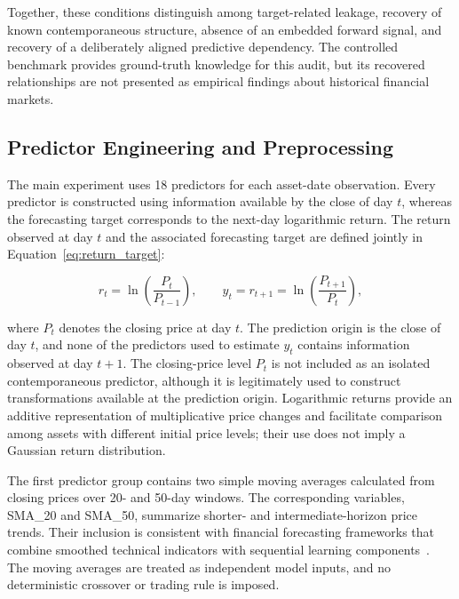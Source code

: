 \documentclass[utf8]{FrontiersinHarvard} %
\begin{document}
Together, these conditions distinguish among target-related leakage, recovery of known contemporaneous structure, absence of an embedded forward signal, and recovery of a deliberately aligned predictive dependency. The controlled benchmark provides ground-truth knowledge for this audit, but its recovered relationships are not presented as empirical findings about historical financial markets.

\subsection{Predictor Engineering and Preprocessing}
\label{subsec:predictor_engineering}

The main experiment uses 18 predictors for each asset-date observation. Every predictor is constructed using information available by the close of day \(t\), whereas the forecasting target corresponds to the next-day logarithmic return. The return observed at day \(t\) and the associated forecasting target are defined jointly in Equation~\ref{eq:return_target}:

\begin{equation}
	r_t
	=
	\ln\left(\frac{P_t}{P_{t-1}}\right),
	\qquad
	y_t
	=
	r_{t+1}
	=
	\ln\left(\frac{P_{t+1}}{P_t}\right),
	\label{eq:return_target}
\end{equation}

where \(P_t\) denotes the closing price at day \(t\). The prediction origin is the close of day \(t\), and none of the predictors used to estimate \(y_t\) contains information observed at day \(t+1\). The closing-price level \(P_t\) is not included as an isolated contemporaneous predictor, although it is legitimately used to construct transformations available at the prediction origin. Logarithmic returns provide an additive representation of multiplicative price changes and facilitate comparison among assets with different initial price levels; their use does not imply a Gaussian return distribution.

The first predictor group contains two simple moving averages calculated from closing prices over 20- and 50-day windows. The corresponding variables, SMA\_20 and SMA\_50, summarize shorter- and intermediate-horizon price trends. Their inclusion is consistent with financial forecasting frameworks that combine smoothed technical indicators with sequential learning components~\citep{Srijiranon2022}. The moving averages are treated as independent model inputs, and no deterministic crossover or trading rule is imposed.
\end{document}
